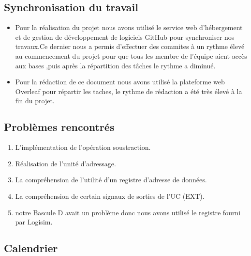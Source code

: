 \subsection{Synchronisation du travail}
\begin{itemize}
\item Pour la réalisation du projet nous avons utilisé le service web d'hébergement et de gestion de développement de logiciels GitHub pour synchroniser nos travaux.Ce dernier nous a permis d’effectuer des commites à un rythme élevé au commencement du projet pour que tous les membre de l'équipe aient accès aux bases ,puis après la répartition des tâches le rythme a diminué.
\item Pour la rédaction de ce document nous avons utilisé la plateforme web Overleaf pour répartir les taches, le rythme de rédaction a été très élevé à la fin du projet. 
\end{itemize}

\subsection{Problèmes rencontrés}
\begin{enumerate}
\item L’implémentation de l’opération soustraction.
\item Réalisation de l'unité d'adressage.
\item La compréhension de l'utilité d'un registre d'adresse de données.
\item La compréhension de certain signaux de sorties de l'UC (EXT).
\item notre Bascule D avait un problème donc nous avons utilisé le registre fourni par Logisim. 
\end{enumerate}

\clearpage
\subsection{Calendrier}

